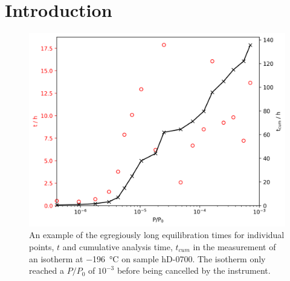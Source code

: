 \newpage
\section{Introduction}
\label{s:dual_intro}

\begin{figure}[b!]
    \centering
    \includegraphics[width=0.95\columnwidth,keepaspectratio]{5-dual_isotherm/figs/timings.png}
    \caption{An example of the egregiously long equilibration times for individual points, $t$ and cumulative analysis time, $t_{cum}$ in the measurement of an  isotherm at \qty{-196}{\degreeCelsius} on sample hD-0700. The isotherm only reached a $P/P_0$ of $10^{-3}$ before being cancelled by the instrument.}
    \label{fig:timings}
\end{figure}


